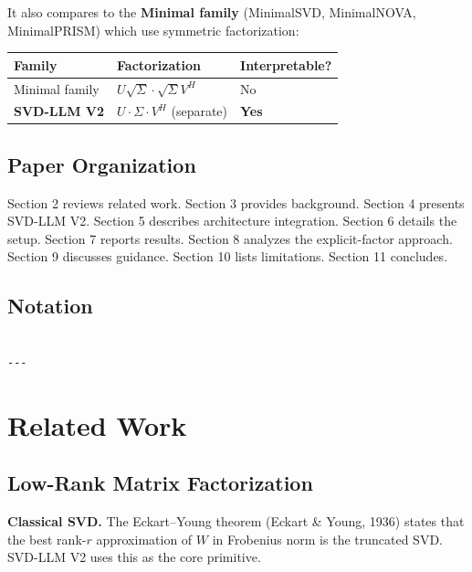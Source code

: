 It also compares to the \textbf{Minimal family} (MinimalSVD, MinimalNOVA, 
MinimalPRISM) which use symmetric factorization:

\begin{table}[H]
\centering
\small
\begin{tabular}{lll}
\toprule
\textbf{Family} & \textbf{Factorization} & \textbf{Interpretable?} \\
\midrule
Minimal family & $U\sqrt{\Sigma} \cdot \sqrt{\Sigma} V^H$ & No \\
\textbf{SVD-LLM V2} & $U \cdot \Sigma \cdot V^H$ (separate) & \textbf{Yes} \\
\bottomrule
\end{tabular}
\end{table}

\subsection{Paper Organization}

Section 2 reviews related work. Section 3 provides background. Section 4 
presents SVD-LLM V2. Section 5 describes architecture integration. Section 6 
details the setup. Section 7 reports results. Section 8 analyzes the 
explicit-factor approach. Section 9 discusses guidance. Section 10 lists 
limitations. Section 11 concludes.



\subsection{Notation}

\begin{lstlisting}

---
\end{lstlisting}


\section{Related Work}

\subsection{Low-Rank Matrix Factorization}

\textbf{Classical SVD.} The Eckart--Young theorem (Eckart \& Young, 1936) states 
that the best rank-$r$ approximation of $W$ in Frobenius norm is the 
truncated SVD. SVD-LLM V2 uses this as the core primitive.

